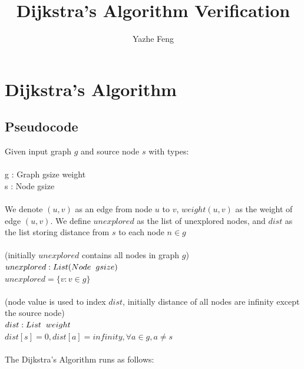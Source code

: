 \documentclass[11pt, oneside]{article}   	%
\title{Dijkstra's Algorithm Verification}
\author{Yazhe Feng}
\newcommand\tab[1][1cm]{\hspace*{#1}}
\newcommand\tsp[1][0.2cm]{\hspace*{#1}}
\theoremstyle{definition}
\begin{document}
\maketitle

\section{Dijkstra's Algorithm}

\subsection{Pseudocode}
Given input graph $g$ and source node $s$ with types:
\\\\
  \tab g : Graph gsize weight\\
  \tab s : Node gsize
\\\\
We denote $(u, v)$ as an edge from node $u$ to $v$, $weight(u, v)$ as the weight of edge $(u, v)$. We define $unexplored$ as the list of unexplored nodes, and $dist$ as the list storing distance from $s$ to each node $n \in g$
\\\\
\tab (initially $unexplored$ contains all nodes in graph $g$)\\
\tab $unexplored : List (Node \tsp gsize)$\\
\tab $unexplored = \{v : v \in g\}$
\\\\
\tab (node value is used to index $dist$, initially distance of all nodes are infinity except 
\\ \tab the source node)\\
\tab $dist : List \tsp weight$ \\
\tab $dist[s] = 0, dist[a] = infinity, \forall a \in g, a \neq s$
\\\\
The Dijkstra's Algorithm runs as follows: 
\\\\
\end{document}
